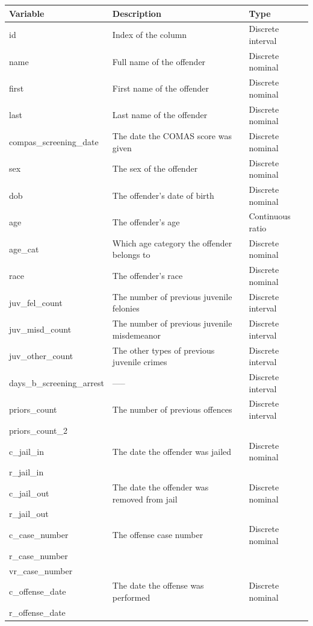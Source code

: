 \documentclass[11pt, fleqn, titlepage]{article}
\begin{document}
	
	\begin{longtable}{l l l} \label{allVars}
		Variable & Description & Type \\ \hline
		id & Index of the column & Discrete interval \\
		name & Full name of the offender & Discrete nominal \\
		first & First name of the offender & Discrete nominal \\
		last & Last name of the offender & Discrete nominal \\
		compas\_screening\_date & The date the COMAS score was given & Discrete nominal \\
		sex & The sex of the offender & Discrete nominal \\
		dob & The offender's date of birth & Discrete nominal \\
		age & The offender's age & Continuous ratio \\
		age\_cat & Which age category the offender belongs to & Discrete nominal \\
		race & The offender's race & Discrete nominal \\
		juv\_fel\_count & The number of previous juvenile felonies & Discrete interval \\
		juv\_misd\_count & The number of previous juvenile misdemeanor & Discrete interval \\
		juv\_other\_count & The other types of previous juvenile crimes & Discrete interval \\
		days\_b\_screening\_arrest & ----- & Discrete interval \\ \hdashline
		priors\_count & The number of previous offences & Discrete interval \\
		priors\_count\_2 & & \\ \hdashline
		c\_jail\_in & The date the offender was jailed & Discrete nominal \\
		r\_jail\_in & & \\ \hdashline
		c\_jail\_out & The date the offender was removed from jail & Discrete nominal \\
		r\_jail\_out & & \\ \hdashline
		c\_case\_number & The offense case number & Discrete nominal \\
		r\_case\_number & & \\
		vr\_case\_number & & \\ \hdashline
		c\_offense\_date & The date the offense was performed & Discrete nominal \\
		r\_offense\_date & & \\

\end{longtable}
\end{document}
